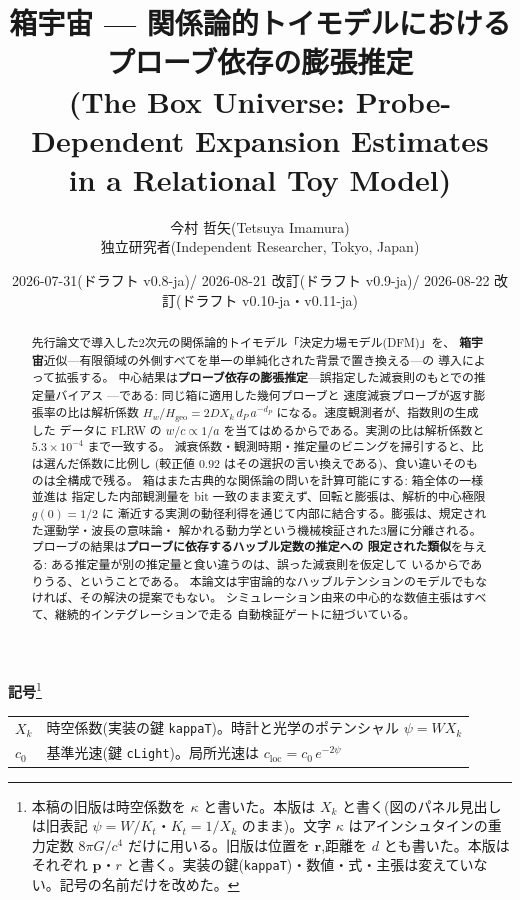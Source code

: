 \documentclass[a4paper,10pt,twocolumn]{ltjsarticle}
\title{箱宇宙 --- 関係論的トイモデルにおける\\
  プローブ依存の膨張推定\\
  {\large (The Box Universe: Probe-Dependent Expansion Estimates\\
  in a Relational Toy Model)}}
\author{今村 哲矢(Tetsuya Imamura)\\
  {\small 独立研究者(Independent Researcher, Tokyo, Japan)}}
\date{2026-07-31(ドラフト v0.8-ja)/ 2026-08-21 改訂(ドラフト v0.9-ja)/
  2026-08-22 改訂(ドラフト v0.10-ja・v0.11-ja)}
\begin{document}
\maketitle

\begin{abstract}
先行論文で導入した2次元の関係論的トイモデル「決定力場モデル(DFM)」を、
\textbf{箱宇宙}近似---有限領域の外側すべてを単一の単純化された背景で置き換える---の
導入によって拡張する。
中心結果は\textbf{プローブ依存の膨張推定}---誤指定した減衰則のもとでの推定量バイアス
---である: 同じ箱に適用した幾何プローブと
速度減衰プローブが返す膨張率の比は解析係数
$H_w/H_{\mathrm{geo}}=2D X_k\,d_P\,a^{-d_P}$ になる。速度観測者が、指数則の生成した
データに FLRW の $w/c\propto1/a$ を当てはめるからである。実測の比は解析係数と
$5.3\times10^{-4}$ まで一致する。
減衰係数・観測時期・推定量のビニングを掃引すると、比は選んだ係数に比例し
(較正値 $0.92$ はその選択の言い換えである)、食い違いそのものは全構成で残る。
箱はまた古典的な関係論の問いを計算可能にする: 箱全体の一様並進は
指定した内部観測量を bit 一致のまま変えず、回転と膨張は、解析的中心極限 $g(0)=1/2$ に
漸近する実測の動径利得を通じて内部に結合する。膨張は、規定された運動学・波長の意味論・
解かれる動力学という機械検証された3層に分離される。
プローブの結果は\textbf{プローブに依存するハッブル定数の推定への
限定された類似}を与える: ある推定量が別の推定量と食い違うのは、誤った減衰則を仮定して
いるからでありうる、ということである。
本論文は宇宙論的なハッブルテンションのモデルでもなければ、その解決の提案でもない。
シミュレーション由来の中心的な数値主張はすべて、継続的インテグレーションで走る
自動検証ゲートに紐づいている。
\end{abstract}

\noindent\textbf{記号}\footnote{本稿の旧版は時空係数を $\kappa$ と書いた。本版は $X_k$ と書く(図のパネル見出しは旧表記 $\psi = W/K_t$・$K_t = 1/X_k$ のまま)。文字 $\kappa$ はアインシュタインの重力定数 $8\pi G/c^4$ だけに用いる。旧版は位置を $\bm r$,距離を $d$ とも書いた。本版はそれぞれ $\bm p$・$r$ と書く。実装の鍵(\texttt{kappaT})・数値・式・主張は変えていない。記号の名前だけを改めた。}
\begin{center}
\small
\begin{tabular}{@{}lp{}@{}}
\hline
$X_k$ & 時空係数(実装の鍵 \texttt{kappaT})。時計と光学のポテンシャル $\psi = W X_k$ \\
$c_0$ & 基準光速(鍵 \texttt{cLight})。局所光速は $c_{\mathrm{loc}} = c_0\,e^{-2\psi}$ \\
\hline
\end{tabular}
\end{center}
\end{document}
